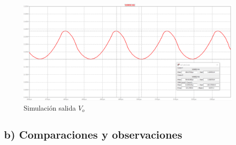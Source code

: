 \documentclass[e4_tp1_main.tex]{subfiles}
\begin{document}
\begin{figure}[H]
\centering
\includegraphics[width=0.9\linewidth]{Imagenes/Punto3/Vo.png}
\caption{Simulación salida $V_o$}
\end{figure}

\subsection*{b) Comparaciones y observaciones}



\newpage
\end{document}

